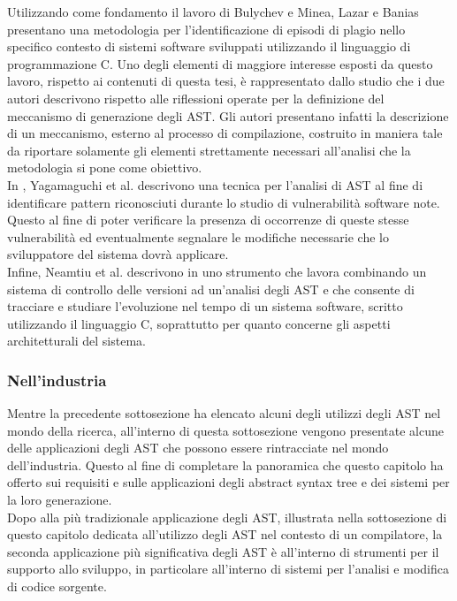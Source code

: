 Utilizzando come fondamento il lavoro di Bulychev e Minea, Lazar e Banias
presentano una metodologia \cite{DBLP:conf/saci/LazarB14} per l’identificazione
di episodi di plagio nello specifico contesto di sistemi software sviluppati
utilizzando il linguaggio di programmazione C. Uno degli elementi di maggiore
interesse esposti da questo lavoro, rispetto ai contenuti di questa tesi, è
rappresentato dallo studio che i due autori descrivono rispetto alle riflessioni
operate per la definizione del meccanismo di generazione degli AST. Gli autori
presentano infatti la descrizione di un meccanismo, esterno al processo di
compilazione, costruito in maniera tale da riportare solamente gli elementi
strettamente necessari all’analisi che la metodologia si pone come obiettivo.\\

In \cite{DBLP:conf/acsac/YamaguchiLR12}, Yagamaguchi et al. descrivono una
tecnica per l’analisi di AST al fine di identificare pattern riconosciuti
durante lo studio di vulnerabilità software note. Questo al fine di poter
verificare la presenza di occorrenze di queste stesse vulnerabilità ed
eventualmente segnalare le modifiche necessarie che lo sviluppatore del sistema
dovrà applicare.\\

Infine, Neamtiu et al. descrivono in \cite{DBLP:journals/sigsoft/NeamtiuFH05}
uno strumento che lavora combinando un sistema di controllo delle versioni ad
un’analisi degli AST e che consente di tracciare e studiare l’evoluzione nel
tempo di un sistema software, scritto utilizzando il linguaggio C, soprattutto
per quanto concerne gli aspetti architetturali del sistema.

\subsubsection{Nell’industria}

Mentre la precedente sottosezione ha elencato alcuni degli utilizzi degli AST
nel mondo della ricerca, all’interno di questa sottosezione vengono presentate
alcune delle applicazioni degli AST che possono essere rintracciate nel mondo
dell’industria. Questo al fine di completare la panoramica che questo capitolo
ha offerto sui requisiti e sulle applicazioni degli abstract syntax tree e dei
sistemi per la loro generazione.\\

Dopo alla più tradizionale applicazione degli AST, illustrata nella sottosezione
di questo capitolo dedicata all’utilizzo degli AST nel contesto di un
compilatore, la seconda applicazione più significativa degli AST è all’interno
di strumenti per il supporto allo sviluppo, in particolare all’interno di
sistemi per l'analisi e modifica di codice sorgente.\\

